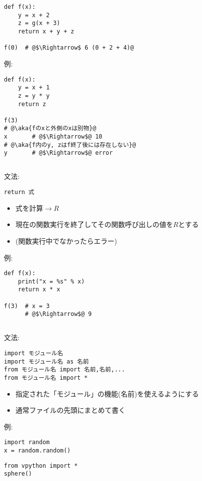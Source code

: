 \documentclass[landscape,7pt,dvipdfmx]{article}
\newcommand{\aka}[1]{{\color{red}{#1}}}
\newcommand{\ao}[1]{{\color{blue}{#1}}}
\begin{document}
\begin{multicols*}{3}
\begin{lstlisting}
def f(x):
    y = x + 2
    z = g(x + 3)
    return x + y + z

f(0)  # @$\Rightarrow$ 6 (0 + 2 + 4)@ 
\end{lstlisting}
例:
\begin{lstlisting}
def f(x):
    y = x + 1
    z = y * y
    return z

f(3)
# @\aka{fのxと外側のxは別物}@
x       # @$\Rightarrow$@ 10
# @\aka{f内のy, zはf終了後には存在しない}@
y       # @$\Rightarrow$@ error
\end{lstlisting}

\subsection{\ao{return文}}
文法:
\begin{lstlisting}
return 式
\end{lstlisting}
\begin{itemize}
\item 式を計算$\rightarrow R$
\item 現在の関数実行を終了してその関数呼び出しの値を$R$とする
\item (関数実行中でなかったらエラー)
\end{itemize}
例:
\begin{lstlisting}
def f(x):
    print("x = %s" % x)
    return x * x

f(3)  # x = 3
      # @$\Rightarrow$@ 9
\end{lstlisting}

\subsection{\ao{import}}
文法:
\begin{lstlisting}
import モジュール名
import モジュール名 as 名前
from モジュール名 import 名前,名前,...
from モジュール名 import *
\end{lstlisting}
\begin{itemize}
\item 指定された「モジュール」の機能(名前)を使えるようにする
\item 通常ファイルの先頭にまとめて書く
\end{itemize}
例:
\begin{lstlisting}
import random
x = random.random()
\end{lstlisting}

\begin{lstlisting}
from vpython import *
sphere()
\end{lstlisting}


\end{multicols*}
\end{document}
